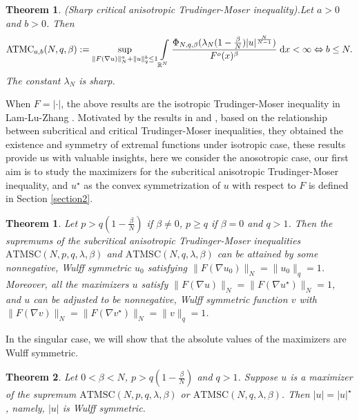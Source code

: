 \documentclass[11pt]{article}
\theoremstyle{plain}
\newtheorem{theorem}{Theorem}[section]
\numberwithin{equation}{section}
\newtheorem{theoremalph}{Theorem}
\newcommand{\R}{\mathbb{R}}
\begin{document}
\begin{theoremalph}(Sharp critical anisotropic Trudinger-Moser inequality).\label{thb}
Let $a>0$ and $b>0$. Then
\begin{align}
    \mathrm{ATMC}_{a,b}(N,q,\beta):=\sup\limits_{\|F(\nabla u)\|_{N}^{a}+\|u\|_{q}^{b}\leq 1}\int\limits_{\R^{N}}\frac{\Phi_{N,q,\beta}(\lambda_{N}(1-\frac{\beta}{N})\lvert u\rvert^{\frac{N}{N-1}})}{F^{o}(x)^{\beta}}\;\mathrm{d}x<\infty\Leftrightarrow b\leq N.\notag
\end{align}
The constant $\lambda_{N}$ is sharp.
\end{theoremalph}
When $F=\lvert\cdot\rvert$, the above results are the isotropic Trudinger-Moser inequality in Lam-Lu-Zhang \cite{Lam-Lu-Zhang-2019}.  Motivated by the results in \cite{Lam-Lu-Zhang-2017} and \cite{Lam-Lu-Zhang-2019'}, based on the relationship between  subcritical and
critical  Trudinger-Moser inequalities, they  obtained the existence and symmetry of extremal functions under isotropic case, these results provide us with valuable insights, here we consider  the anosotropic case, our first aim  is to study the maximizers for the subcritical anisotropic Trudinger-Moser inequality, and $u^{\star}$ as the convex symmetrization of $u$ with respect to $F$ is defined in Section \ref{section2}.

\begin{theorem}\label{th1.1}
    Let $p>q(1-\frac{\beta}{N})$ if $\beta\neq0$, $p\geq q$ if $\beta=0$ and $q>1$. Then the supremums of the subcritical anisotropic Trudinger-Moser inequalities $\mathrm{ATMSC}(N,p,q,\lambda,\beta)$ and $\mathrm{ATMSC}(N,q,\lambda,\beta)$ can be attained by some nonnegative, Wulff symmetric $u_{0}$ satisfying $\|F(\nabla u_{0})\|_{N}=\|u_{0}\|_{q}=1$. Moreover, all the maximizers $u$ satisfy $\|F(\nabla u)\|_{N}=\|F(\nabla u^{\star})\|_{N}=1$, and $u$ can be adjusted to be nonnegative, Wulff symmetric function $v$ with $\|F(\nabla v)\|_{N}=\|F(\nabla v^{\star})\|_{N}=\|v\|_{q}=1$.
\end{theorem}

In the singular case, we will show that the absolute values of the maximizers are Wulff symmetric.

\begin{theorem}\label{th1.2}
    Let $0<\beta<N$, $p>q(1-\frac{\beta}{N})$ and $q>1$. Suppose $u$ is a maximizer of the supremum $\mathrm{ATMSC}(N,p,q,\lambda,\beta)$ or $\mathrm{ATMSC}(N,q,\lambda,\beta)$. Then $\lvert u\rvert=\lvert u\rvert^{\star}$, namely, $\lvert u\rvert$ is Wulff symmetric.
\end{theorem}
\end{document}
